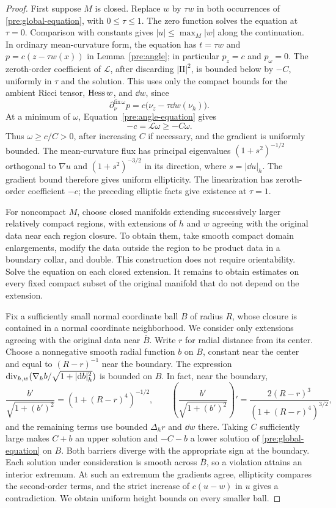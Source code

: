 \begin{proof}
First suppose $M$ is closed. Replace $w$ by $\tau w$ in both occurrences
of \eqref{pre:global-equation}, with $0\le\tau\le1$. The zero function
solves the equation at $\tau=0$. Comparison with constants gives
$|u|\le\max_M|w|$ along the continuation. In ordinary mean-curvature
form, the equation has $t=\tau w$ and $p=c(z-\tau w(x))$ in
Lemma~\ref{pre:angle}; in particular $p_z=c$ and $p_\omega=0$.
The zeroth-order coefficient of $\mathcal L$, after discarding
$|\mathrm{II}|^2$, is bounded below by $-C$, uniformly in $\tau$ and
the solution. This uses only the compact bounds for the ambient Ricci
tensor, $\operatorname{Hess} w$, and $\dd w$, since
\[
 \partial_\nu^{\mathrm{fix}\,\omega}p
      =c\bigl(\nu_z-\tau\dd w(\nu_h)\bigr).
\]
At a minimum of $\omega$, Equation~\eqref{pre:angle-equation} gives
\[
 -c=\mathcal L\omega\ge-C\omega.
\]
Thus $\omega\ge c/C>0$, after increasing $C$ if necessary, and the
gradient is uniformly bounded. The mean-curvature flux has principal
eigenvalues $(1+s^2)^{-1/2}$ orthogonal to $\nabla u$ and
$(1+s^2)^{-3/2}$ in its direction, where $s=|\dd u|_h$.
The gradient bound therefore gives uniform ellipticity. The
linearization has zeroth-order coefficient $-c$; the preceding elliptic
facts give existence at $\tau=1$.

For noncompact $M$, choose closed manifolds extending successively larger
relatively compact regions, with extensions of $h$ and $w$ agreeing
with the original data near each region closure. To obtain them, take
smooth compact domain enlargements, modify the data outside the region
to be product data in a boundary collar, and double. This construction
does not require orientability. Solve the equation on each closed
extension. It remains to obtain estimates on every fixed compact
subset of the original manifold that do not depend on the extension.

Fix a sufficiently small normal coordinate ball $B$ of radius $R$,
whose closure is contained in a normal coordinate neighborhood. We
consider only extensions agreeing with the original data near
$\overline B$. Write $r$ for radial distance from its center.
Choose a nonnegative smooth radial function $b$ on $B$, constant near
the center and equal to $(R-r)^{-1}$ near the boundary. The expression
$\operatorname{div}_{h,w}(\nabla_h b/\sqrt{1+|\mathrm d b|_h^2})$ is bounded on $B$.
In fact, near the boundary,
\[
 \frac{b'}{\sqrt{1+(b')^2}}=(1+(R-r)^4)^{-1/2},\qquad
 \left(\frac{b'}{\sqrt{1+(b')^2}}\right)'
       =\frac{2(R-r)^3}{(1+(R-r)^4)^{3/2}},
\]
and the remaining terms use bounded $\Delta_hr$ and $\dd w$ there.
Taking $C$ sufficiently large makes $C+b$ an upper solution and
$-C-b$ a lower solution of \eqref{pre:global-equation} on $B$.
Both barriers diverge with the appropriate sign at the boundary.
Each solution under consideration is smooth across $\overline B$,
so a violation attains an interior extremum. At such an extremum the
gradients agree, ellipticity compares the second-order terms, and the
strict increase of $c(u-w)$ in $u$ gives a contradiction. We obtain
uniform height bounds on every smaller ball.


\end{proof}
